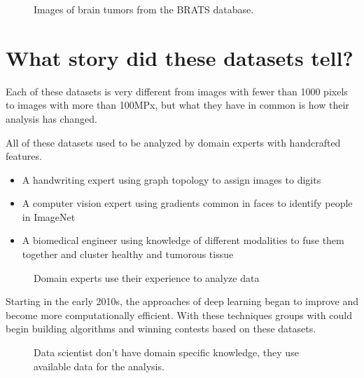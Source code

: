 \documentclass[letterpaper,10pt,english]{sphinxmanual}
\begin{document}
\begin{figure}[htbp]
\centering
\capstart

\noindent{}
\caption{Images of brain tumors from the BRATS database.}\label{\detokenize{03-Datasets:id8}}\end{figure}




\section{What story did these datasets tell?}
\label{\detokenize{03-Datasets:what-story-did-these-datasets-tell}}


\sphinxAtStartPar
Each of these datasets is very different from images with fewer than 1000 pixels to images with more than 100MPx, but what they have in common is how their analysis has changed.

\sphinxAtStartPar
All of these datasets used to be analyzed by domain experts with hand\sphinxhyphen{}crafted features.
\begin{itemize}
\item {} 
\sphinxAtStartPar
A handwriting expert using graph topology to assign images to digits

\item {} 
\sphinxAtStartPar
A computer vision expert using gradients common in faces to identify people in ImageNet

\item {} 
\sphinxAtStartPar
A biomedical engineer using knowledge of different modalities to fuse them together and cluster healthy and tumorous tissue

\end{itemize}

\begin{figure}[htbp]
\centering
\capstart

\noindent{}
\caption{Domain experts use their experience to analyze data}\label{\detokenize{03-Datasets:id9}}\end{figure}

\sphinxAtStartPar
Starting in the early 2010s, the approaches of deep learning began to improve and become more computationally efficient. With these techniques groups with  could begin building algorithms and winning contests based on these datasets.

\begin{figure}[htbp]
\centering
\capstart

\noindent{}
\caption{Data scientist don’t have domain specific knowledge, they use available data for the analysis.}\label{\detokenize{03-Datasets:id10}}\end{figure}
\end{document}
